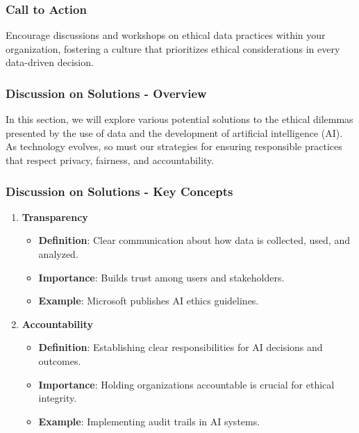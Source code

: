 \documentclass[aspectratio=169]{beamer}
\begin{document}
\begin{frame}[fragile]
    \frametitle{Call to Action}
    Encourage discussions and workshops on ethical data practices within your organization, fostering a culture that prioritizes ethical considerations in every data-driven decision.
\end{frame}

\begin{frame}[fragile]
    \frametitle{Discussion on Solutions - Overview}
    In this section, we will explore various potential solutions to the ethical dilemmas presented by the use of data and the development of artificial intelligence (AI). As technology evolves, so must our strategies for ensuring responsible practices that respect privacy, fairness, and accountability.
\end{frame}

\begin{frame}[fragile]
    \frametitle{Discussion on Solutions - Key Concepts}
    \begin{enumerate}
        \item \textbf{Transparency}
            \begin{itemize}
                \item \textbf{Definition}: Clear communication about how data is collected, used, and analyzed.
                \item \textbf{Importance}: Builds trust among users and stakeholders.
                \item \textbf{Example}: Microsoft publishes AI ethics guidelines.
            \end{itemize}
        \item \textbf{Accountability}
            \begin{itemize}
                \item \textbf{Definition}: Establishing clear responsibilities for AI decisions and outcomes.
                \item \textbf{Importance}: Holding organizations accountable is crucial for ethical integrity.
                \item \textbf{Example}: Implementing audit trails in AI systems.
            \end{itemize}
    \end{enumerate}
\end{frame}
\end{document}
